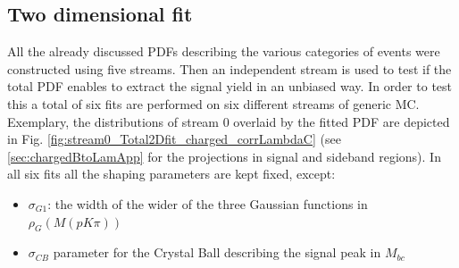 \newpage
\subsection{Two dimensional fit}\label{2DtotalFit}

All the already discussed PDFs describing the various categories of events were constructed using five streams. Then an independent stream is used to test if the total PDF enables to extract the signal yield in an unbiased way. In order to test this a total of six fits are performed on six different streams of generic MC. Exemplary, the distributions of stream 0 overlaid by the fitted PDF are depicted in Fig. \ref{fig:stream0_Total2Dfit_charged_corrLambdaC} (see \cref{sec:chargedBtoLamApp} for the projections in signal and sideband regions). 
In all six fits all the shaping parameters are kept fixed, except:
\begin{itemize}
    \item $\sigma_{G1}$: the width of the wider of the three Gaussian functions in $\rho_G(M(p K \pi))$
    \item $\sigma_{CB}$ parameter for the Crystal Ball describing the signal peak in $M_{bc}$
\end{itemize}


